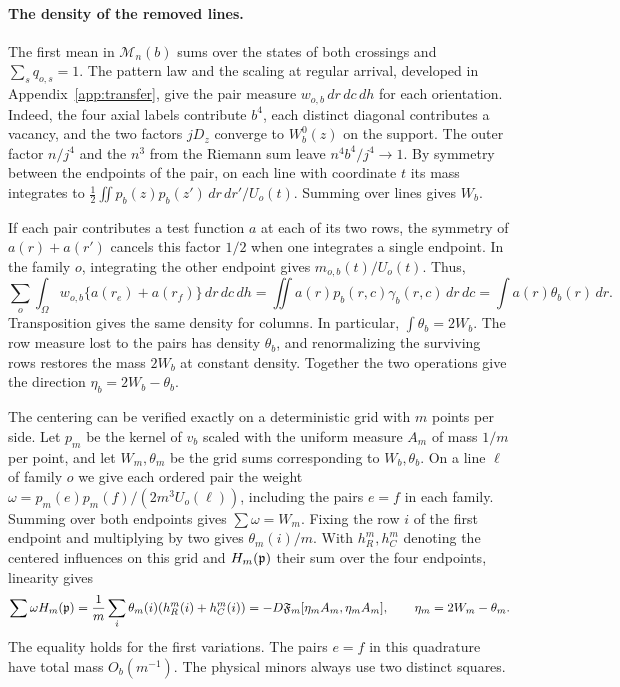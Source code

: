 \paragraph{The density of the removed lines.} The first mean in \(\mathcal M_n(b)\) sums over the states
of both crossings and \(\sum_s q_{o,s}=1\). The pattern law and the scaling at regular arrival, developed
in Appendix~\ref{app:transfer}, give the pair measure \(w_{o,b}\,dr\,dc\,dh\) for each orientation.
Indeed, the four axial labels contribute \(b^4\), each distinct diagonal contributes a vacancy, and the
two factors \(jD_z\) converge to \(W_b^0(z)\) on the support. The outer factor \(n/j^4\) and the \(n^3\)
from the Riemann sum leave \(n^4 b^4/j^4\to1\). By symmetry between the endpoints of the pair, on each
line with coordinate \(t\) its mass integrates to \(\frac12\iint p_b(z)p_b(z')\,dr\,dr'/U_o(t)\). Summing
over lines gives \(W_b\).

If each pair contributes a test function \(a\) at each of its two rows, the symmetry of \(a(r)+a(r')\)
cancels this factor \(1/2\) when one integrates a single endpoint. In the family \(o\), integrating the
other endpoint gives \(m_{o,b}(t)/U_o(t)\). Thus,
\[
 \sum_o\int_\Omega w_{o,b}\{a(r_e)+a(r_f)\}\,dr\,dc\,dh
 =\iint a(r)p_b(r,c)\gamma_b(r,c)\,dr\,dc
 =\int a(r)\theta_b(r)\,dr .
\]
Transposition gives the same density for columns. In particular, \(\int\theta_b=2W_b\). The row measure
lost to the pairs has density \(\theta_b\), and renormalizing the surviving rows restores the mass
\(2W_b\) at constant density. Together the two operations give the direction \(\eta_b=2W_b-\theta_b\).

The centering can be verified exactly on a deterministic grid with \(m\) points per side. Let \(p_m\) be
the kernel of \(v_b\) scaled with the uniform measure \(A_m\) of mass \(1/m\) per point, and let
\(W_m,\theta_m\) be the grid sums corresponding to \(W_b,\theta_b\). On a line \(\ell\) of family \(o\)
we give each ordered pair the weight \(\omega=p_m(e)p_m(f)/(2m^3 U_o(\ell))\), including the pairs
\(e=f\) in each family. Summing over both endpoints gives \(\sum\omega=W_m\). Fixing the row \(i\) of the
first endpoint and multiplying by two gives \(\theta_m(i)/m\). With \(h_R^m,h_C^m\) denoting the centered
influences on this grid and \(H_m(\mathfrak p)\) their sum over the four endpoints, linearity gives
\[
 \sum\omega H_m(\mathfrak p)
 =\frac1m\sum_i\theta_m(i)(h_R^m(i)+h_C^m(i))
 =-D\mathfrak F_m[\eta_m A_m,\eta_m A_m],\qquad \eta_m=2W_m-\theta_m .
\]
The equality holds for the first variations. The pairs \(e=f\) in this quadrature have total mass
\(O_b(m^{-1})\). The physical minors always use two distinct squares.

